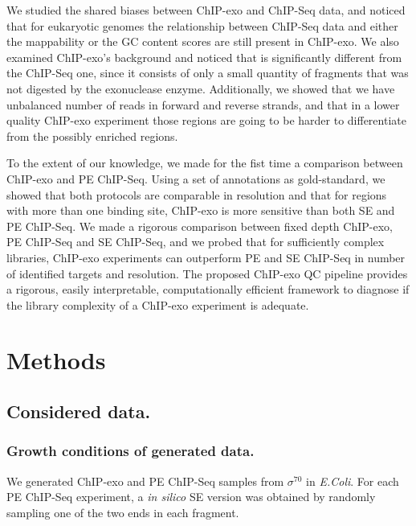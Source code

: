 \documentclass{bmcart}
\newcommand{\sig}{\sigma^{70}}
\begin{document}
We studied the shared biases between ChIP-exo and ChIP-Seq data, and
noticed that for eukaryotic genomes the relationship between ChIP-Seq
data and either the mappability or the GC content scores are still
present in ChIP-exo. We also examined ChIP-exo's background and
noticed that is significantly different from the ChIP-Seq one, since
it consists of only a small quantity of fragments that was not
digested by the exonuclease enzyme. Additionally, we showed that we
have unbalanced number of reads in forward and reverse strands, and
that in a lower quality ChIP-exo experiment those regions are going to
be harder to differentiate from the possibly enriched regions.

To the extent of our knowledge, we made for the fist time a comparison
between ChIP-exo and PE ChIP-Seq. Using a set of annotations as
gold-standard, we showed that both protocols are comparable in
resolution and that for regions with more than one binding site,
ChIP-exo is more sensitive than both SE and PE ChIP-Seq. We made a
rigorous comparison between fixed depth ChIP-exo, PE ChIP-Seq and SE
ChIP-Seq, and we probed that for sufficiently complex libraries,
ChIP-exo experiments can outperform PE and SE ChIP-Seq in number of
identified targets and resolution. The proposed ChIP-exo QC pipeline
provides a rigorous, easily interpretable, computationally efficient
framework to diagnose if the library complexity of a ChIP-exo
experiment is adequate.

\section*{Methods}
\label{sec:methods}

\subsection*{Considered data.}


\subsubsection*{Growth conditions of generated data.}

We generated ChIP-exo and PE ChIP-Seq samples from $\sig$ in
\emph{E.Coli}. For each PE ChIP-Seq experiment, a \emph{in silico} SE
version was obtained by randomly sampling one of the two ends in each
fragment. 
\end{document}
